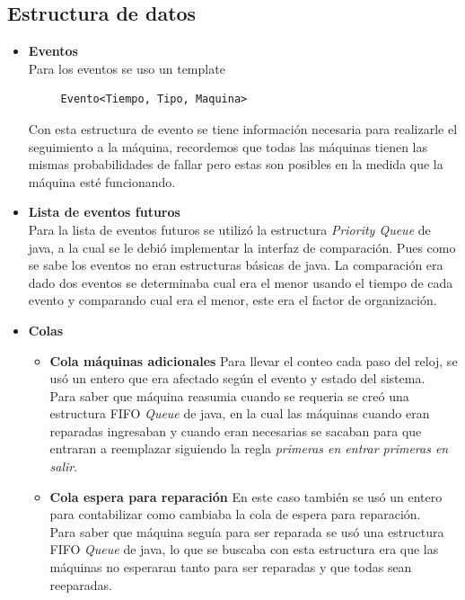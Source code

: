 \documentclass[12pt]{article}
\begin{document}
\subsection{Estructura de datos}
\begin{itemize}

	 \item \textbf{Eventos}\\
	 Para los eventos se uso un template 
	 \begin{verbatim}
	 Evento<Tiempo, Tipo, Maquina>
	 \end{verbatim}
	 Con esta estructura de evento se tiene información necesaria para realizarle el seguimiento a la máquina, recordemos que todas las m\'aquinas tienen las mismas probabilidades de fallar pero estas son posibles en la medida que la m\'aquina est\'e funcionando. 
	 
	 \item \textbf{Lista de eventos futuros}\\
	 Para la lista de eventos futuros se utilizó la estructura \emph{Priority Queue} de java, a la cual se le debi\'o implementar la interfaz de comparaci\'on. Pues como se sabe los eventos no eran estructuras b\'asicas de java. La comparaci\'on era dado dos eventos se determinaba cual era el menor usando el tiempo de cada evento y comparando cual era el menor, este era el factor de organizaci\'on. 
	 
 	 \item \textbf{Colas}\\
 	 \begin{itemize}
 	 \item \textbf{Cola máquinas adicionales}
 	 Para llevar el conteo cada paso del reloj, se usó un entero que era afectado según el evento y estado del sistema.\\
 	 Para saber que máquina reasumia cuando se requeria se creó una estructura FIFO \emph{Queue} de java, en la cual las máquinas cuando eran reparadas ingresaban y cuando eran necesarias se sacaban para que entraran a reemplazar siguiendo la regla \emph{primeras en entrar primeras en salir}.
 	 
 	 \item \textbf{Cola espera para reparación}
 	 En este caso tambi\'en se us\'o un entero para contabilizar como cambiaba la cola de espera para reparaci\'on. \\
 	 
 	 Para saber que m\'aquina segu\'ia para ser reparada se us\'o una estructura FIFO \emph{Queue} de java, lo que se buscaba con esta estructura era que las m\'aquinas no esperaran tanto para ser reparadas y que todas sean reeparadas.
 	 \end{itemize}
 	 

\end{itemize}
\end{document}
